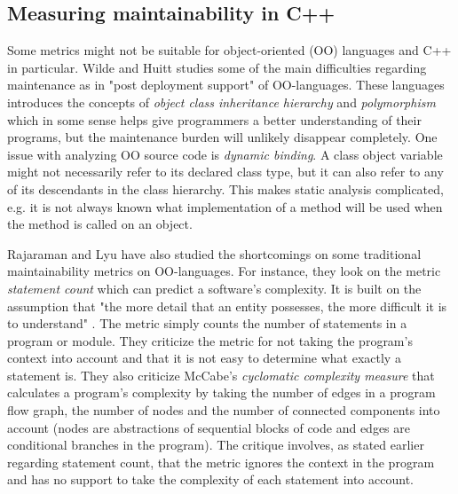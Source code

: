 \subsection{Measuring maintainability in C++}

Some metrics might not be suitable for object-oriented (OO) languages and C++
in particular. Wilde and Huitt \cite{wilde1991maintenance} studies some of the
main difficulties regarding maintenance as in "post deployment support" of
OO-languages. These languages introduces the concepts of \textit{object class
inheritance hierarchy} and \textit{polymorphism} which in some sense helps give
programmers a better understanding of their programs, but the maintenance
burden will unlikely disappear completely. One issue with analyzing OO source
code is \textit{dynamic binding}. A class object variable might not necessarily
refer to its declared class type, but it can also refer to any of its
descendants in the class hierarchy. This makes static analysis complicated,
e.g. it is not always known what implementation of a method will be used when
the method is called on an object.

Rajaraman and Lyu \cite{rajaraman1992reliability} have also studied the
shortcomings on some traditional maintainability metrics on OO-languages. For
instance, they look on the metric \textit{statement count} which can predict a
software's complexity. It is built on the assumption that "the more detail that
an entity possesses, the more difficult it is to understand"
\cite{rajaraman1992reliability}. The metric simply counts the number of
statements in a program or module. They criticize the metric for not taking the
program's context into account and that it is not easy to determine what
exactly a statement is. They also criticize McCabe's
\cite{mccabe1976complexity} \textit{cyclomatic complexity measure} that
calculates a program's complexity by taking the number of edges in a program
flow graph, the number of nodes and the number of connected components into
account (nodes are abstractions of sequential blocks of code and edges are
conditional branches in the program). The critique involves, as stated earlier
regarding statement count, that the metric ignores the context in the program
and has no support to take the complexity of each statement into account.

